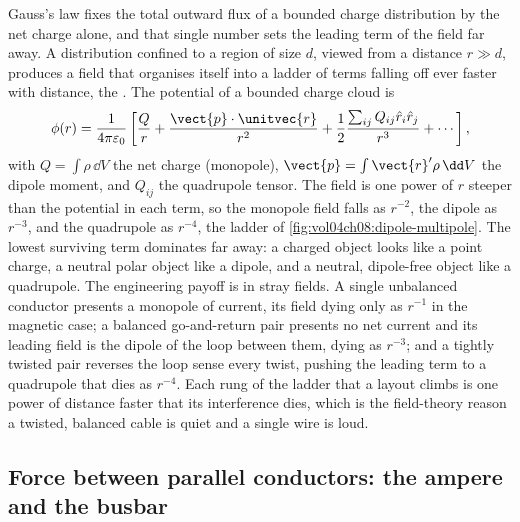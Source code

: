 Gauss's law fixes the total outward flux of a bounded charge distribution
by the net charge alone, and that single number sets the leading term of
the field far away. A distribution confined to a region of size $d$,
viewed from a distance $r \gg d$, produces a field that organises itself
into a ladder of terms falling off ever faster with distance, the
. The potential of a bounded charge cloud is
\[
\phi(r) = \frac{1}{4\pi\varepsilon_0}\left[\frac{Q}{r} +
\frac{\vect{p}\cdot\unitvec{r}}{r^{2}} + \frac{1}{2}
\frac{\sum_{ij}Q_{ij}\hat r_i\hat r_j}{r^{3}} + \cdots\right],
\]
with $Q = \int\rho\,\dd V$ the net charge (monopole), $\vect{p} =
\int\vect{r}'\rho\,\dd V$ the dipole moment, and $Q_{ij}$ the quadrupole
tensor. The field is one power of $r$ steeper than the potential in each
term, so the monopole field falls as $r^{-2}$, the dipole as $r^{-3}$, and
the quadrupole as $r^{-4}$, the ladder of \cref{fig:vol04ch08:dipole-multipole}.
The lowest surviving term dominates far away: a charged object looks like a
point charge, a neutral polar object like a dipole, and a neutral,
dipole-free object like a quadrupole. The engineering payoff is in stray
fields. A single unbalanced conductor presents a monopole of current, its
field dying only as $r^{-1}$ in the magnetic case; a balanced go-and-return
pair presents no net current and its leading field is the dipole of the
loop between them, dying as $r^{-3}$; and a tightly twisted pair reverses
the loop sense every twist, pushing the leading term to a quadrupole that
dies as $r^{-4}$. Each rung of the ladder that a layout climbs is one power
of distance faster that its interference dies, which is the field-theory
reason a twisted, balanced cable is quiet and a single wire is loud.



\subsection{Force between parallel conductors: the ampere and the busbar}

